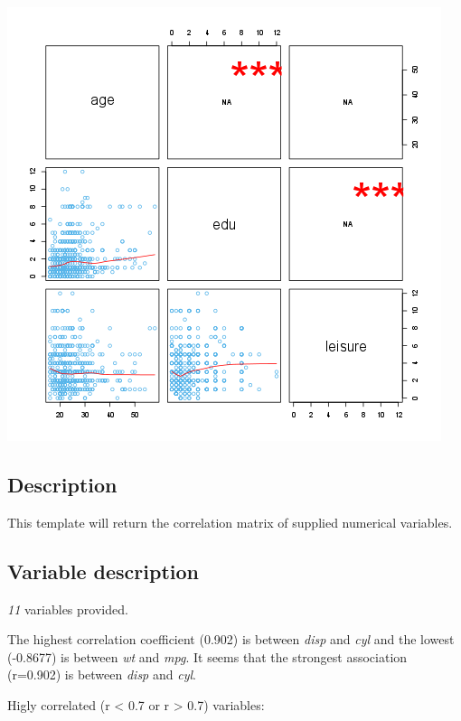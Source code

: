 \documentclass[]{article}
\makeatletter
\def\maxwidth{\ifdim\Gin@nat@width>\linewidth\linewidth
\else\Gin@nat@width\fi}
\let\Oldincludegraphics\includegraphics
\renewcommand{\includegraphics}[1]{\Oldincludegraphics[width=\maxwidth]{#1}}
\makeatother
\begin{document}
\href{/tmp/RtmpeIwHkw/file744ae54d-hires.png}{\includegraphics{0e4cca7017b21223d68df3b9e300c895.png}}

\subsection{Description}

This template will return the correlation matrix of supplied numerical
variables.

\subsection{Variable description}

\emph{11} variables provided.

The highest correlation coefficient (0.902) is between \emph{disp} and
\emph{cyl} and the lowest (-0.8677) is between \emph{wt} and \emph{mpg}.
It seems that the strongest association (r=0.902) is between \emph{disp}
and \emph{cyl}.

Higly correlated (r \textless{} 0.7 or r \textgreater{} 0.7) variables:
\end{document}
